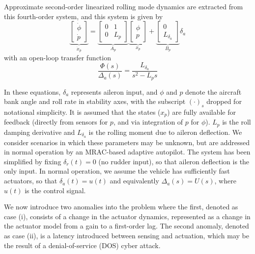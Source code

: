 Approximate second-order linearized rolling mode dynamics are extracted from this fourth-order system, and this system is given by
\begin{equation}
	\underbrace{\begin{bmatrix}
			\dot{\phi} \\ \dot{p}
		\end{bmatrix}}_{\dot{x}_p} = \underbrace{\begin{bmatrix}
			0 & 1 \\ 0 & L_p
		\end{bmatrix}}_{A_p} \underbrace{\begin{bmatrix}
			\phi \\ p
		\end{bmatrix}}_{x_p} + \underbrace{\begin{bmatrix}
			0 \\ L_{\delta_a}
		\end{bmatrix}}_{B_p} \delta_a
	\label{eqn:2nd_order_lateral}
\end{equation} \noindent with an open-loop transfer function
\begin{equation}
		\frac{\Phi(s)}{\Delta_a(s)} = \frac{L_{\delta_a}}{s^2 - L_p s}
\end{equation}

In these equations, $\delta_a$ represents aileron input, and $\phi$ and $p$ denote the aircraft bank angle and roll rate in stability axes, with the subscript $(\cdot)_s$ dropped for notational simplicity. It is assumed that the states ($x_p$) are fully available for feedback (directly from sensors for $p$, and via integration of $p$ for $\phi$). $L_p$ is the roll damping derivative and $L_{\delta_a}$ is the rolling moment due to aileron deflection. We consider scenarios in which these parameters may be unknown, but are addressed in normal operation by an MRAC-based adaptive autopilot. The system has been simplified by fixing $\delta_r(t) = 0$ (no rudder input), so that aileron deflection is the only input. In normal operation, we assume the vehicle has sufficiently fast actuators, so that $\delta_a(t) = u(t)$ and equivalently $\Delta_a(s) = U(s)$, where $u(t)$ is the control signal. 

We now introduce two anomalies into the problem where the first, denoted as case (i), consists of a change in the actuator dynamics, represented as a change in the actuator model from a gain to a first-order lag. The second anomaly, denoted as case (ii), is a latency introduced between sensing and actuation, which may be the result of a denial-of-service (DOS) cyber attack. 

